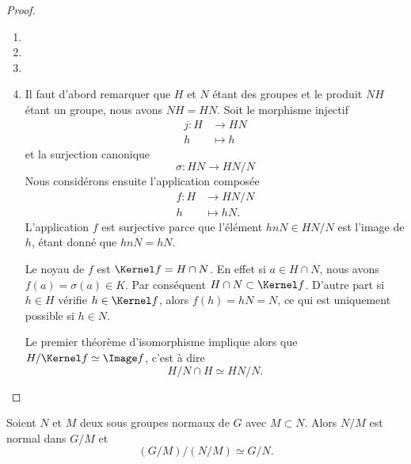 \begin{proof}
    \begin{enumerate}
        \item
        \item
        \item
        \item
            Il faut d'abord remarquer que \( H\) et \( N\) étant des groupes et le produit \( NH\) étant un groupe, nous avons \( NH=HN\). Soit le morphisme injectif
            \begin{equation}
                \begin{aligned}
                    j\colon H&\to HN \\
                    h&\mapsto h
                \end{aligned}
            \end{equation}
            et la surjection canonique
            \begin{equation}
                \sigma\colon HN\to HN/N 
            \end{equation}
            Nous considérons ensuite l'application composée
            \begin{equation}
                \begin{aligned}
                    f\colon H&\to HN/N \\
                    h&\mapsto hN. 
                \end{aligned}
            \end{equation}
            L'application \( f\) est surjective parce que l'élément \( hnN\in HN/N\) est l'image de \( h\), étant donné que \( hnN=hN\).

            Le noyau de \( f\) est \( \Kernel f=H\cap N\). En effet si \( a\in H\cap N\), nous avons \( f(a)=\sigma(a)\in K\). Par conséquent \( H\cap N\subset \Kernel f\). D'autre part si \( h\in H\) vérifie \( h\in\Kernel f\), alors \( f(h)=hN=N\), ce qui est uniquement possible si \( h\in N\).

            Le premier théorème d'isomorphisme implique alors que \( H/\Kernel f\simeq \Image f\), c'est à dire
            \begin{equation}
                H/N\cap H\simeq HN/N.
            \end{equation}
    \end{enumerate}
\end{proof}

\begin{theorem}  \label{ThoezgBep}
    Soient \( N\) et \( M\) deux sous groupes normaux de \( G\) avec \( M\subset N\). Alors \( N/M\) est normal dans \( G/M\) et
    \begin{equation}
        (G/M)/(N/M)\simeq G/N.
    \end{equation}
\end{theorem}

